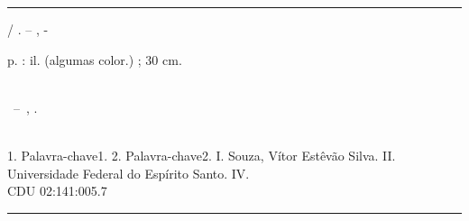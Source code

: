 \documentclass[
	12pt,				%
	openright,			%
	oneside,			%
	a4paper,			%
	english,			%
	french,				%
	spanish,			%
	brazil				%
	]{abntex2}
\begin{document}
\frenchspacing

\imprimircapa

\imprimirfolhaderosto*



%     

\begin{fichacatalografica}
	\vspace*{\fill}
	\hrule
	\begin{center}
	\begin{minipage}[c]{12.5cm}
	
	\imprimirautor
	
	\hspace{0.5cm} \imprimirtitulo  / \imprimirautor. --
	\imprimirlocal, \imprimirdata-
	
	\hspace{0.5cm} \pageref{LastPage} p. : il. (algumas color.) ; 30 cm.\\
	
	\hspace{0.5cm} \imprimirorientadorRotulo~\imprimirorientador\\
	
	\hspace{0.5cm}
	\parbox[t]{\textwidth}{\imprimirtipotrabalho~--~\imprimirinstituicao,
	\imprimirdata.}\\
	
	\hspace{0.5cm}
		1. Palavra-chave1.
		2. Palavra-chave2.
		I. Souza, Vítor Estêvão Silva.
		II. Universidade Federal do Espírito Santo.
		IV. \imprimirtitulo \\ 			
	
	\hspace{8.75cm} CDU 02:141:005.7\\
	
	\end{minipage}
	\end{center}
	\hrule
\end{fichacatalografica}
\end{document}
